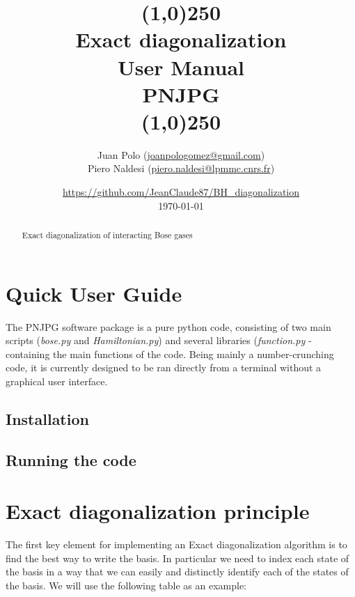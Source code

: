 \documentclass[paper=a4, fontsize=11pt]{scrartcl} %
\title{\line(1,0){250}\\Exact diagonalization\\User Manual\\PNJPG\\\line(1,0){250}}
\author{Juan Polo (\url{joanpologomez@gmail.com}) \\ 
Piero Naldesi (\url{piero.naldesi@lpmmc.cnrs.fr})}
\affil{LPMMC, Grenoble, France}
\date{\url{https://github.com/JeanClaude87/BH_diagonalization}\\\today}
\numberwithin{equation}{section} %
\numberwithin{figure}{section} %
\numberwithin{table}{section} %
\begin{document}
\maketitle

\begin{abstract}
Exact diagonalization of interacting Bose gases
\end{abstract}

\tableofcontents

\clearpage

\section{Quick User Guide}

The PNJPG software package is a pure python code, consisting of two main scripts (\textit{bose.py} and \textit{Hamiltonian.py}) and several libraries (\textit{function.py} - containing the main functions of the code. Being mainly a number-crunching code, it is currently designed to be ran directly from a terminal without a graphical user interface.

\subsection{Installation}


\subsection{Running the code}
\label{subsec:run}






\newpage

\section{Exact diagonalization principle}


The first key element for implementing an Exact diagonalization algorithm is to find the best way to write the basis. In particular we need to index each state of the basis in a way that we can easily and distinctly identify each of the states of the basis. We will use the following table as an example:
\end{document}

